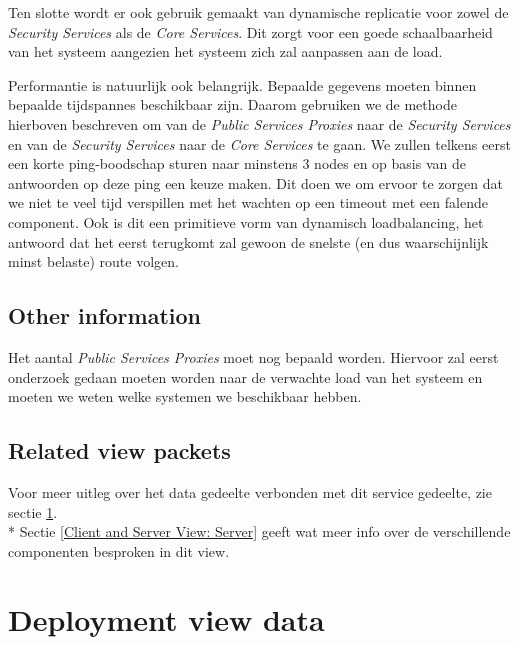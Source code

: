\documentclass[a4paper,10pt]{article}
\begin{document}
Ten slotte wordt er ook gebruik gemaakt van dynamische replicatie voor zowel de \textit{Security Services} als de \textit{Core Services}. Dit zorgt voor een goede schaalbaarheid van het systeem aangezien het systeem zich zal aanpassen aan de load.

Performantie is natuurlijk ook belangrijk. Bepaalde gegevens moeten binnen bepaalde tijdspannes beschikbaar zijn. Daarom gebruiken we de methode hierboven beschreven om van de \textit{Public Services Proxies} naar de \textit{Security Services} en van de \textit{Security Services} naar de \textit{Core Services} te gaan. We zullen telkens eerst een korte ping-boodschap sturen naar minstens 3 nodes en op basis van de antwoorden op deze ping een keuze maken. Dit doen we om ervoor te zorgen dat we niet te veel tijd verspillen met het wachten op een timeout met een falende component. Ook is dit een primitieve vorm van dynamisch loadbalancing, het antwoord dat het eerst terugkomt zal gewoon de snelste (en dus waarschijnlijk minst belaste) route volgen.

\subsection{Other information}

Het aantal \textit{Public Services Proxies} moet nog bepaald worden. Hiervoor zal eerst onderzoek gedaan moeten worden naar de verwachte load van het systeem en moeten we weten welke systemen we beschikbaar hebben.

\subsection{Related view packets}
Voor meer uitleg over het data gedeelte verbonden met dit service gedeelte, zie sectie \ref{sec:deployment_data}.\\*
Sectie \ref{Client and Server View: Server} geeft wat meer info over de verschillende componenten besproken in dit view.

\clearpage
\section{Deployment view data}
\label{sec:deployment_data}
\end{document}

